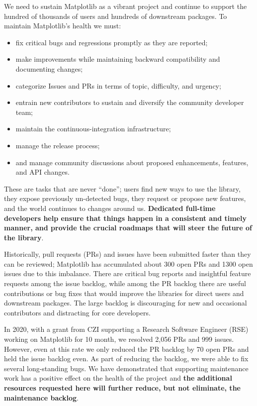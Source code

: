\documentclass[12pt]{article}
\numberwithin{page}{section}
\begin{document}
We need to sustain Matplotlib as a vibrant project and continue to support the
hundred of thousands of users and hundreds of downstream packages.  To maintain
Matplotlib's health we must:
\begin{itemize}[noitemsep]
\item fix critical bugs and regressions promptly as they are reported;
\item make improvements while maintaining backward compatibility and
  documenting changes;
\item categorize Issues and PRs in terms of topic, difficulty, and
  urgency;
\item entrain new contributors to sustain and diversify the community
  developer team;
\item maintain the continuous-integration infrastructure;
\item manage the release process;
\item and manage community discussions about proposed enhancements, features,
  and API changes.
\end{itemize}
These are tasks that are never ``done''; users find new ways to use
the library, they expose previously un-detected bugs, they request or propose new
features, and the world continues to changes around us.   \textbf{Dedicated
full-time developers help ensure that things happen in a consistent and timely
manner, and provide the crucial roadmaps that will steer the future of the library}.



Historically, pull requests (PRs) and issues have been submitted
faster than they can be reviewed; Matplotlib has accumulated about 300
open PRs and 1300 open issues due to this imbalance. There are
critical bug reports and insightful feature requests among the issue
backlog, while among the PR backlog there are useful contributions or
bug fixes that would improve the libraries for direct users and
downstream packages.  The large backlog is discouraging for new and
occasional contributors and distracting for core developers.


In 2020, with a grant from CZI supporting a Research Software Engineer
(RSE) working on Matplotlib for 10 month, we resolved 2,056 PRs and
999 issues.  However, even at this rate we only reduced the PR backlog
by 70 open PRs and held the issue backlog even.  As part of reducing
the backlog, we were able to fix several long-standing bugs.  We have
demonstrated that supporting maintenance work has a positive effect on
the health of the project and \textbf{the additional resources
  requested here will further reduce, but not eliminate, the
  maintenance backlog}.
\end{document}
